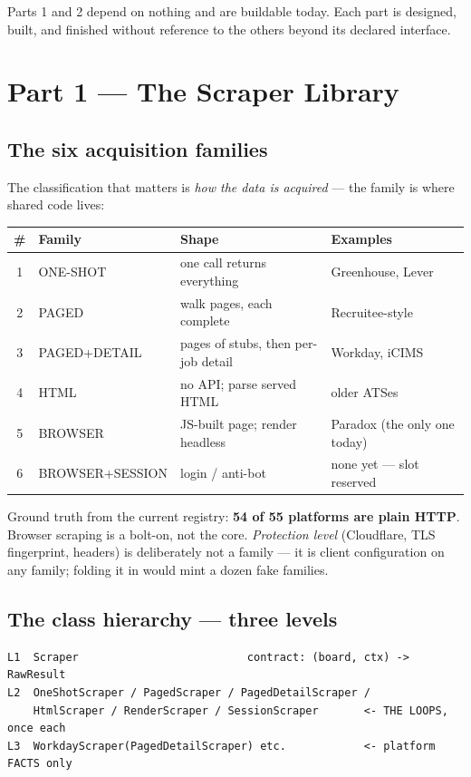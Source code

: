 \documentclass[11pt,a4paper]{article}
\begin{document}
Parts 1 and 2 depend on nothing and are buildable today. Each part is designed, built, and finished
without reference to the others beyond its declared interface.

\section{Part 1 --- The Scraper Library}

\subsection{The six acquisition families}
The classification that matters is \emph{how the data is acquired} --- the family is where shared code lives:

\begin{center}
\begin{tabular}{@{}clll@{}}
\toprule
\# & Family & Shape & Examples \\
\midrule
1 & ONE-SHOT & one call returns everything & Greenhouse, Lever \\
2 & PAGED & walk pages, each complete & Recruitee-style \\
3 & PAGED+DETAIL & pages of stubs, then per-job detail & Workday, iCIMS \\
4 & HTML & no API; parse served HTML & older ATSes \\
5 & BROWSER & JS-built page; render headless & Paradox (the only one today) \\
6 & BROWSER+SESSION & login / anti-bot & none yet --- slot reserved \\
\bottomrule
\end{tabular}
\end{center}

Ground truth from the current registry: \textbf{54 of 55 platforms are plain HTTP}. Browser scraping is a
bolt-on, not the core. \emph{Protection level} (Cloudflare, TLS fingerprint, headers) is deliberately not a
family --- it is client configuration on any family; folding it in would mint a dozen fake families.

\subsection{The class hierarchy --- three levels}
\begin{verbatim}
L1  Scraper                          contract: (board, ctx) -> RawResult
L2  OneShotScraper / PagedScraper / PagedDetailScraper /
    HtmlScraper / RenderScraper / SessionScraper       <- THE LOOPS, once each
L3  WorkdayScraper(PagedDetailScraper) etc.            <- platform FACTS only
\end{verbatim}
\end{document}
